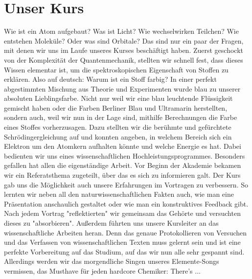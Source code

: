 \section{Unser Kurs}
Wie ist ein Atom aufgebaut? Was ist Licht? Wie wechselwirken Teilchen? Wie entstehen Moleküle? Oder was sind Orbitale?
Das sind nur ein paar der Fragen, mit denen wir uns im Laufe unseres Kurses beschäftigt haben. Zuerst geschockt von der Komplexität der Quantenmechanik, stellten wir schnell fest, dass dieses Wissen elementar ist, um die spektroskopischen Eigenschaft von Stoffen zu erklären. Also auf deutsch: Warum ist ein Stoff farbig? In einer perfekt abgestimmten Mischung aus Theorie und Experimenten wurde blau zu unserer absoluten Lieblingsfarbe. Nicht nur weil wir eine blau leuchtende Flüssigkeit gemischt haben oder die Farben Berliner Blau und Ultramarin herstellten, sondern auch, weil wir nun in der Lage sind, mithilfe Berechnungen die Farbe eines Stoffes vorherzusagen. Dazu stellten wir die berühmte und gefürchtete Schrödingergleichung auf und konnten angeben, in welchem Bereich sich ein Elektron um den Atomkern aufhalten könnte und welche Energie es hat. Dabei bedienten wir uns eines wissenschaftlichen Hochleistungsprogrammes. Besonders gefallen hat allen die eigenständige Arbeit. Vor Beginn der Akademie bekamen wir ein Referatsthema zugeteilt, über das es sich zu informieren galt. Der Kurs gab uns die Möglichkeit auch unsere Erfahrungen im Vortragen zu verbessern. So lernten wir neben all den naturwissenschaftlichen Fakten auch, wie man eine Präsentation anschaulich gestaltet oder wie man ein konstruktives Feedback gibt. Nach jedem Vortrag "reflektierten" wir gemeinsam das Gehörte und versuchten dieses zu "absorbieren". Außerdem führten uns unsere Kursleiter an das wissenschaftliche Arbeiten heran. Denn das genaue Protokollieren von Versuchen und das Verfassen von wissenschaftlichen Texten muss gelernt sein und ist eine perfekte Vorbereitung auf das Studium, auf das wir nun alle sehr gespannt sind. Allerdings werden wir das morgendliche Singen unseres Elemente-Songs vermissen, das Musthave für jeden hardcore Chemiker:
There's ...
